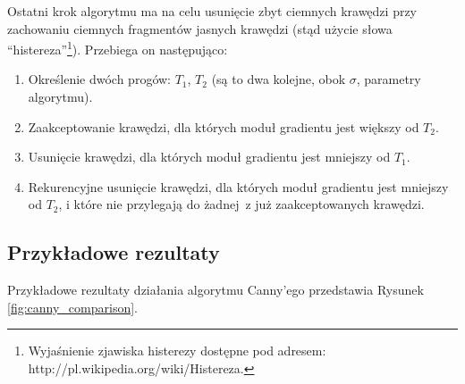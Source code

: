 \documentclass[a4paper,twocolumn,12pt]{article}
\begin{document}
Ostatni krok algorytmu ma na celu usunięcie zbyt ciemnych krawędzi przy zachowaniu ciemnych fragmentów jasnych krawędzi (stąd użycie słowa ``histereza''\footnote{Wyjaśnienie zjawiska histerezy dostępne pod adresem: http://pl.wikipedia.org/wiki/Histereza.}).
Przebiega on następująco:

\begin{enumerate}
 \item Określenie dwóch progów: $T_1$, $T_2$ (są to dwa kolejne, obok $\sigma$, parametry algorytmu).
 \item Zaakceptowanie krawędzi, dla których moduł gradientu jest większy od $T_2$.
 \item Usunięcie krawędzi, dla których moduł gradientu jest mniejszy od $T_1$.
 \item Rekurencyjne usunięcie krawędzi, dla których moduł gradientu jest mniejszy od $T_2$, i które nie przylegają do żadnej~z już zaakceptowanych krawędzi.
\end{enumerate}


\subsection{Przykładowe rezultaty}

Przykładowe rezultaty działania algorytmu Canny'ego przedstawia Rysunek \ref{fig:canny_comparison}.
\end{document}
